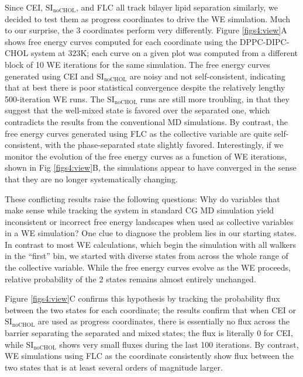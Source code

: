 \documentclass{biophys-new}
\providecommand{\DIFaddtex}[1]{{\protect\color{blue}\uwave{#1}}} %
\providecommand{\DIFaddbegin}{} %
\providecommand{\DIFaddend}{} %
\providecommand{\DIFadd}[1]{\texorpdfstring{\DIFaddtex{#1}}{#1}} %
\newcommand{\DIFaddincludegraphics}[2][]{{\color{blue}\fbox{\DIFOincludegraphics[#1]{#2}}}} %
\DeclareRobustCommand{\DIFaddbegin}{\DIFOaddbegin \let\includegraphics\DIFaddincludegraphics} %
\DeclareRobustCommand{\DIFaddend}{\DIFOaddend \let\includegraphics\DIFOincludegraphics} %
\begin{document}
Since CEI, $\text{SI}_{\text{noCHOL}}$, and FLC all track bilayer lipid separation similarly,
we decided to test them as progress coordinates to drive the WE simulation.
Much to our surprise, the 3 coordinates perform very differently.
Figure \ref{figs4:view}A shows free energy curves computed for each coordinate using the DPPC-DIPC-CHOL system at 323K; each curve on a given plot was computed from a different block of 10 WE iterations for the same simulation. The free energy curves generated using CEI and $\text{SI}_{\text{noCHOL}}$ are noisy and not self-consistent, indicating that at best there is poor statistical convergence despite the relatively lengthy 500-iteration WE runs. The $\text{SI}_{\text{noCHOL}}$ runs are still more troubling, in that they suggest that the well-mixed state is favored over the separated one, which contradicts the results from the conventional MD simulations. By contrast, the free energy curves generated using FLC as the collective variable are quite self-consistent, with the phase-separated state slightly favored.
Interestingly, if we monitor the evolution of the free energy curves as a function of WE iterations, shown in Fig \ref{figs4:view}B, the simulations appear to have converged in the sense that they are no longer systematically changing.

These conflicting results raise the following questions: Why do variables that make sense while tracking the system in standard CG MD simulation yield inconsistent or incorrect free energy landscapes when used as collective variables in a  WE simulation?  One clue to diagnose the problem lies in our starting states. In contrast to most WE calculations, which begin the simulation with all walkers in the ``first'' bin, we started with diverse states from across the whole range of the collective variable. While the free energy curves evolve as the WE proceeds,  \DIFaddbegin \DIFadd{for the poorly performing coordinates the }\DIFaddend relative probability of the 2 states remains almost entirely unchanged.

Figure \ref{figs4:view}C confirms this hypothesis by tracking the probability flux between the two states for each coordinate; the results confirm that when CEI or $\text{SI}_{\text{noCHOL}}$ are used as progress coordinates, there is essentially no flux across the barrier separating the separated and mixed states; the flux is literally 0 for CEI, while $\text{SI}_{\text{noCHOL}}$ shows very small fluxes during the last 100 iterations. By contrast, WE simulations using FLC as the coordinate consistently show flux between the two states that is at least several orders of magnitude larger.
\end{document}
